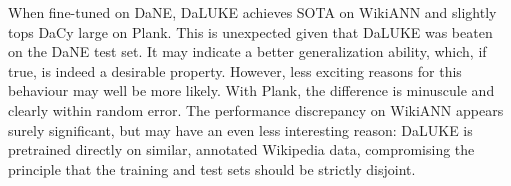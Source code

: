 \documentclass[main.tex]{subfiles}
\begin{document}
When fine-tuned on DaNE, DaLUKE achieves SOTA on WikiANN and slightly tops DaCy large on Plank.
This is unexpected given that DaLUKE was beaten on the DaNE test set.
It may indicate a better generalization ability, which, if true, is indeed a desirable property.
However, less exciting reasons for this behaviour may well be more likely.
With Plank, the difference is minuscule and clearly within random error.
The performance discrepancy on WikiANN appears surely significant, but may have an even less interesting reason:
DaLUKE is pretrained directly on similar, annotated Wikipedia data, compromising the principle that the training and test sets should be strictly disjoint.
\end{document}

